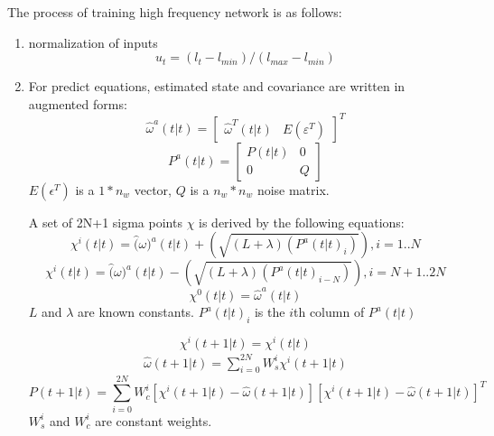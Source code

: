 \documentclass[letterpaper]{article}
\begin{document}
The process of training high frequency network is as follows:
\begin{enumerate}
  \item normalization of inputs
    \begin{equation} u_t=(l_t-l_{min})/(l_{max}-l_{min}) \end{equation}
  \item 
    For predict equations, estimated state and covariance are written in augmented forms:
    \begin{equation} \hat{\omega}^a(t|t)=
      \begin{bmatrix} \hat{\omega}^T(t|t) & E(\varepsilon^T)\end{bmatrix}^T
    \end{equation}
    \begin{equation} P^a(t|t)=
      \begin{bmatrix}
        P(t|t) & 0 \\
        0 & Q
      \end{bmatrix}
    \end{equation}
    $E(\epsilon^T)$ is a $1*n_w$ vector, $Q$ is a $n_w*n_w$ noise matrix.

    A set of 2N+1 sigma points $\chi$ is derived by the following equations:
    \begin{equation}
      \chi^i(t|t)=\hat(\omega)^a(t|t)+(\sqrt{(L+\lambda)(P^a(t|t)_i)}),i=1..N
    \end{equation}
    \begin{equation}
      \chi^i(t|t)=\hat(\omega)^a(t|t)-(\sqrt{(L+\lambda)(P^a(t|t)_{i-N})}),i=N+1..2N
    \end{equation}
    \begin{equation}
      \chi^0(t|t)=\hat{\omega}^a(t|t)
    \end{equation}
    $L$ and $\lambda$ are known constants. $P^a(t|t)_i$ is the $i$th column of $P^a(t|t)$

    \begin{equation}
      \chi^i(t+1|t)=\chi^i(t|t)
    \end{equation}
    \begin{align}
      \hat{\omega}(t+1|t)=\displaystyle\sum\limits_{i=0}^{2N} W_s^i \chi^i(t+1|t)
    \end{align}
    \begin{equation}
      P(t+1|t)=\displaystyle\sum\limits_{i=0}^{2N} W_c^i[\chi^i(t+1|t)-\hat{\omega}(t+1|t)][\chi^i(t+1|t)-\hat{\omega}(t+1|t)]^T
    \end{equation}
    $W_s^i$ and $W_c^i$ are constant weights.
    

\end{enumerate}
\end{document}

